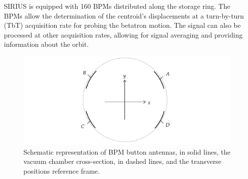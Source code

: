 SIRIUS is equipped with 160 BPMs distributed along the storage ring. The BPMs allow the determination of the centroid's displacements at a turn-by-turn (TbT) acquisition rate for probing the betatron motion. The signal can also be processed at other acquisition rates, allowing for signal averaging and providing information about the orbit.
\begin{figure}
    \centering
    \includegraphics[width=\textwidth]{Images/bpm_scheme.pdf}
    \caption[Schematic representation of BPM button antennas, the vacuum chamber cross-section, and the transverse positions reference frame.]{Schematic representation of BPM button antennas, in solid lines, the vacuum chamber cross-section, in dashed lines, and the transverse positions reference frame.}
    \label{fig:bpms_scheme}
\end{figure}
